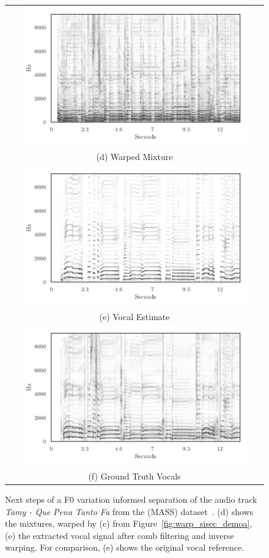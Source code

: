 \begin{figure}
  \centering
\begin{tabular}{c}
  \includegraphics[width=0.9\textwidth]{Chapters/05_Separation_Known/warp-demo/warped.pdf} \\
(d) Warped Mixture \\[6pt]
\includegraphics[width=0.9\textwidth]{Chapters/05_Separation_Known/warp-demo/Estimate.pdf} \\
(e) Vocal Estimate \\[6pt]
\includegraphics[width=0.9\textwidth]{Chapters/05_Separation_Known/warp-demo/reference.pdf} \\
(f) Ground Truth Vocals  \\[6pt]
\end{tabular}
\caption{Next steps of a F0 variation informed separation of the audio track \emph{Tamy - Que Pena Tanto Fa} from the (MASS) dataset~\cite{MTGMASSdb}. (d)  shows the mixtures, warped by (c) from Figure~\ref{fig:warp_sisec_demoa}, (e) the extracted vocal signal after comb filtering and inverse warping. For comparison, (e) shows the original vocal reference.}%
\label{fig:warp_sisec_demob}
\end{figure}

